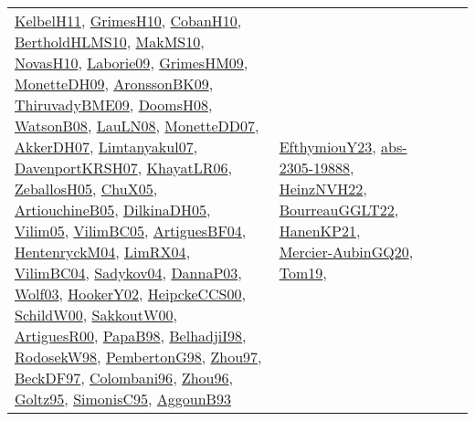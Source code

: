 {\begin{longtable}{lp{3cm}>{\raggedright}p{6cm}>{\raggedright}p{6cm}p{8cm}}
\href{articles/KelbelH11.pdf}{KelbelH11}\cite{KelbelH11}, \href{papers/GrimesH10.pdf}{GrimesH10}\cite{GrimesH10}, \href{papers/CobanH10.pdf}{CobanH10}\cite{CobanH10}, \href{papers/BertholdHLMS10.pdf}{BertholdHLMS10}\cite{BertholdHLMS10}, \href{papers/MakMS10.pdf}{MakMS10}\cite{MakMS10}, \href{articles/NovasH10.pdf}{NovasH10}\cite{NovasH10}, \href{papers/Laborie09.pdf}{Laborie09}\cite{Laborie09}, \href{papers/GrimesHM09.pdf}{GrimesHM09}\cite{GrimesHM09}, \href{papers/MonetteDH09.pdf}{MonetteDH09}\cite{MonetteDH09}, \href{papers/AronssonBK09.pdf}{AronssonBK09}\cite{AronssonBK09}, \href{papers/ThiruvadyBME09.pdf}{ThiruvadyBME09}\cite{ThiruvadyBME09}, \href{papers/DoomsH08.pdf}{DoomsH08}\cite{DoomsH08}, \href{papers/WatsonB08.pdf}{WatsonB08}\cite{WatsonB08}, \href{papers/LauLN08.pdf}{LauLN08}\cite{LauLN08}, \href{papers/MonetteDD07.pdf}{MonetteDD07}\cite{MonetteDD07}, \href{papers/AkkerDH07.pdf}{AkkerDH07}\cite{AkkerDH07}, \href{papers/Limtanyakul07.pdf}{Limtanyakul07}\cite{Limtanyakul07}, \href{papers/DavenportKRSH07.pdf}{DavenportKRSH07}\cite{DavenportKRSH07}, \href{articles/KhayatLR06.pdf}{KhayatLR06}\cite{KhayatLR06}, \href{articles/ZeballosH05.pdf}{ZeballosH05}\cite{ZeballosH05}, \href{papers/ChuX05.pdf}{ChuX05}\cite{ChuX05}, \href{papers/ArtiouchineB05.pdf}{ArtiouchineB05}\cite{ArtiouchineB05}, \href{papers/DilkinaDH05.pdf}{DilkinaDH05}\cite{DilkinaDH05}, \href{papers/Vilim05.pdf}{Vilim05}\cite{Vilim05}, \href{articles/VilimBC05.pdf}{VilimBC05}\cite{VilimBC05}, \href{papers/ArtiguesBF04.pdf}{ArtiguesBF04}\cite{ArtiguesBF04}, \href{papers/HentenryckM04.pdf}{HentenryckM04}\cite{HentenryckM04}, \href{papers/LimRX04.pdf}{LimRX04}\cite{LimRX04}, \href{papers/VilimBC04.pdf}{VilimBC04}\cite{VilimBC04}, \href{papers/Sadykov04.pdf}{Sadykov04}\cite{Sadykov04}, \href{papers/DannaP03.pdf}{DannaP03}\cite{DannaP03}, \href{papers/Wolf03.pdf}{Wolf03}\cite{Wolf03}, \href{papers/HookerY02.pdf}{HookerY02}\cite{HookerY02}, \href{articles/HeipckeCCS00.pdf}{HeipckeCCS00}\cite{HeipckeCCS00}, \href{articles/SchildW00.pdf}{SchildW00}\cite{SchildW00}, \href{articles/SakkoutW00.pdf}{SakkoutW00}\cite{SakkoutW00}, \href{articles/ArtiguesR00.pdf}{ArtiguesR00}\cite{ArtiguesR00}, \href{articles/PapaB98.pdf}{PapaB98}\cite{PapaB98}, \href{articles/BelhadjiI98.pdf}{BelhadjiI98}\cite{BelhadjiI98}, \href{papers/RodosekW98.pdf}{RodosekW98}\cite{RodosekW98}, \href{papers/PembertonG98.pdf}{PembertonG98}\cite{PembertonG98}, \href{articles/Zhou97.pdf}{Zhou97}\cite{Zhou97}, \href{papers/BeckDF97.pdf}{BeckDF97}\cite{BeckDF97}, \href{papers/Colombani96.pdf}{Colombani96}\cite{Colombani96}, \href{papers/Zhou96.pdf}{Zhou96}\cite{Zhou96}, \href{papers/Goltz95.pdf}{Goltz95}\cite{Goltz95}, \href{papers/SimonisC95.pdf}{SimonisC95}\cite{SimonisC95}, \href{articles/AggounB93.pdf}{AggounB93}\cite{AggounB93} & \href{papers/EfthymiouY23.pdf}{EfthymiouY23}\cite{EfthymiouY23}, \href{articles/abs-2305-19888.pdf}{abs-2305-19888}\cite{abs-2305-19888}, \href{articles/HeinzNVH22.pdf}{HeinzNVH22}\cite{HeinzNVH22}, \href{articles/BourreauGGLT22.pdf}{BourreauGGLT22}\cite{BourreauGGLT22}, \href{papers/HanenKP21.pdf}{HanenKP21}\cite{HanenKP21}, \href{papers/Mercier-AubinGQ20.pdf}{Mercier-AubinGQ20}\cite{Mercier-AubinGQ20}, \href{papers/Tom19.pdf}{Tom19}\cite{Tom19}, 
\end{longtable}}
